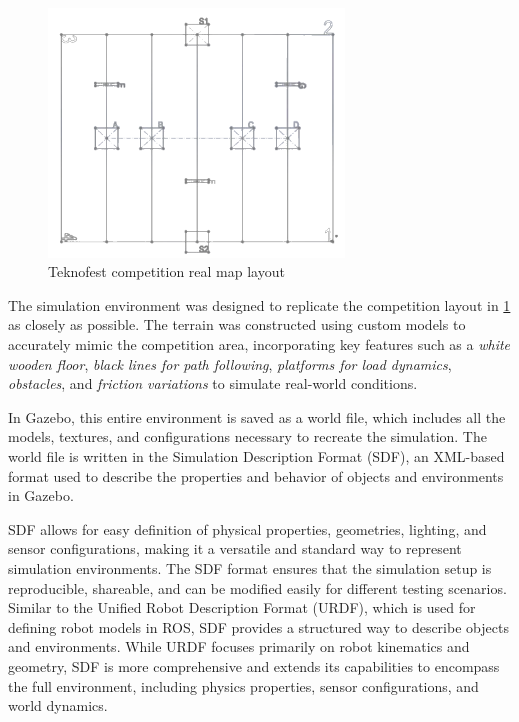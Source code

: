 \documentclass[../../main]{subfiles}
\begin{document}
\begin{figure}[H]
  \centering
\includegraphics[width=0.7\textwidth]{fig/competition_area_layout_teknofest.png}
\caption{Teknofest competition real map layout}
\label{Teknofest competition real map layout} %
\end{figure}


The simulation environment was designed to replicate the competition layout in \cref{Teknofest competition real map layout} as closely as possible. 
The terrain was constructed using custom models to accurately mimic the competition area, incorporating key features such as a 
\emph{white wooden floor}, \emph{black lines for path following}, \emph{platforms for load dynamics}, 
\emph{obstacles}, and \emph{friction variations} to simulate real-world conditions. 

In Gazebo, this entire environment is saved as a world file, which includes all the models, textures, 
and configurations necessary to recreate the simulation. The world file is written in the Simulation Description Format (SDF), 
an XML-based format used to describe the properties and behavior of objects and environments in Gazebo. 

SDF allows for easy definition of physical properties, geometries, lighting, and sensor configurations, making it a versatile 
and standard way to represent simulation environments. The SDF format ensures that the simulation setup is reproducible, 
shareable, and can be modified easily for different testing scenarios. Similar to the Unified Robot Description Format (URDF), 
which is used for defining robot models in ROS, SDF provides a structured way to describe objects and environments. 
While URDF focuses primarily on robot kinematics and geometry, SDF is more comprehensive and extends its capabilities 
to encompass the full environment, including physics properties, sensor configurations, and world dynamics.
\end{document}

